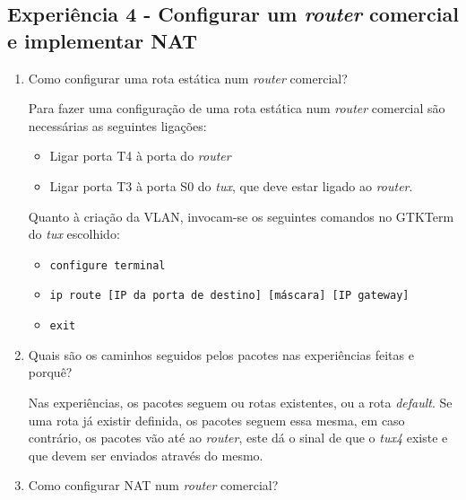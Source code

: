 \documentclass{article}
\begin{document}
\subsection{Experiência 4 - Configurar um \textit{router} comercial e implementar NAT}
\begin{enumerate}
\item Como configurar uma rota estática num \textit{router} comercial?

Para fazer uma configuração de uma rota estática num \textit{router} comercial são necessárias as seguintes ligações:
\begin{itemize}
    \item Ligar porta T4 à porta do \textit{router}
    \item Ligar porta T3 à porta S0 do \textit{tux}, que deve estar ligado ao \textit{router}.
\end{itemize}
Quanto à criação da VLAN, invocam-se os seguintes comandos no GTKTerm do \textit{tux} escolhido:
\begin{itemize}
    \item \texttt{configure terminal}
    \item \texttt{ip route [IP da porta de destino] [máscara] [IP gateway]}
    \item \texttt{exit}
\end{itemize}


\item Quais são os caminhos seguidos pelos pacotes nas experiências feitas e porquê?

Nas experiências, os pacotes seguem ou rotas existentes, ou a rota \textit{default}.
Se uma rota já existir definida, os pacotes seguem essa mesma, em caso contrário, os pacotes vão até ao \textit{router}, este dá o sinal de que o \textit{tux4} existe e que devem ser enviados através do mesmo.

\item Como configurar NAT num \textit{router} comercial?


\end{enumerate}
\end{document}
